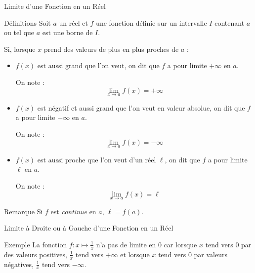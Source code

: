 \documentclass{coursbook}
\begin{document}
    \begin{Gpartie}{Limite d'une Fonction en un Réel} 
        \begin{Spartie}{Définitions} 
            Soit $a$ un réel et $f$ une fonction définie sur un intervalle $I$ contenant $a$ ou tel que $a$ est une borne de $I$.

            Si, lorsque $x$ prend des valeurs de plus en plus proches de $a$ :
            \begin{itemize}
                \item $f(x)$ est aussi grand que l'on veut, on dit que $f$ a pour limite $+\infty$ en $a$.

                On note : \[\boxed{\lim\limits_{x\to a}f(x)=+\infty}\]
                \begin{center}
                    \parbox{\linewidth}{}
                \end{center}
                \vspace*{2ex}
                \item $f(x)$ est négatif et aussi grand que l'on veut en valeur absolue, on dit que $f$ a pour limite $-\infty$ en $a$.

                On note : \[\boxed{\lim\limits_{x\to a}f(x)=-\infty}\]
                \item $f(x)$ est aussi proche que l'on veut d'un réel $\ell$, on dit que $f$ a pour limite $\ell$ en $a$.
                
                On note : \[\boxed{\lim\limits_{x\to a}f(x)=\ell}\]
            \end{itemize}
            \begin{SSpartie}{Remarque} 
                Si $f$ est \emph{continue} en $a$, $\ell=f(a)$.
            \end{SSpartie}
        \end{Spartie}
        \pagebreak
        \begin{Spartie}{Limite à Droite ou à Gauche d'une Fonction en un Réel} 
            \begin{SSpartie}{Exemple} 
                La fonction $f:x\mapsto\frac{1}{x}$ n'a pas de limite en $0$ car lorsque $x$ tend vers $0$ par des valeurs positives, $\frac{1}{x}$ tend vers $+\infty$ et lorsque $x$ tend vers $0$ par valeurs négatives, $\frac{1}{x}$ tend vers $-\infty$.


\end{SSpartie}
\end{Spartie}
\end{Gpartie}
\end{document}
